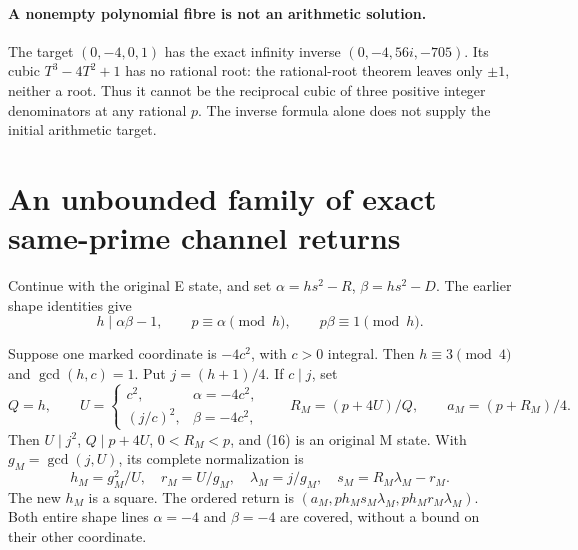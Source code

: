 \paragraph{A nonempty polynomial fibre is not an arithmetic solution.}
The target $(0,-4,0,1)$ has the exact infinity inverse
$(0,-4,56i,-705)$. Its cubic $T^3-4T^2+1$ has no rational root: the rational-root
theorem leaves only $\pm1$, neither a root. Thus it cannot be the reciprocal
cubic of three positive integer denominators at any rational $p$.
The inverse formula alone does not supply the initial arithmetic target.



\section{An unbounded family of exact same-prime channel returns}
Continue with the original E state, and set
$\alpha=hs^2-R$, $\beta=hs^2-D$. The earlier shape identities give
\[
 h\mid\alpha\beta-1,\qquad p\equiv\alpha\pmod h,
 \qquad p\beta\equiv1\pmod h.                         \tag{15}
\]
\begin{theorem}\label{thm:transfer}
Suppose one marked coordinate is $-4c^2$, with $c>0$ integral. Then
$h\equiv3\pmod4$ and $\gcd(h,c)=1$. Put $j=(h+1)/4$.
If $c\mid j$, set
\[
 Q=h,\qquad
 U=\begin{cases}c^2,&\alpha=-4c^2,\\(j/c)^2,&\beta=-4c^2,\end{cases}
 \qquad R_M=(p+4U)/Q,\qquad a_M=(p+R_M)/4.              \tag{16}
\]
Then $U\mid j^2$, $Q\mid p+4U$, $0<R_M<p$, and (16) is an original M state.
With $g_M=\gcd(j,U)$, its complete normalization is
\[
 \boxed{h_M=g_M^2/U,\quad r_M=U/g_M,\quad
 \lambda_M=j/g_M,\quad s_M=R_M\lambda_M-r_M.}           \tag{17}
\]
The new $h_M$ is a square. The ordered return is
$(a_M,ph_Ms_M\lambda_M,ph_Mr_M\lambda_M)$.
Both entire shape lines $\alpha=-4$ and $\beta=-4$ are covered, without a bound
on their other coordinate.
\end{theorem}
